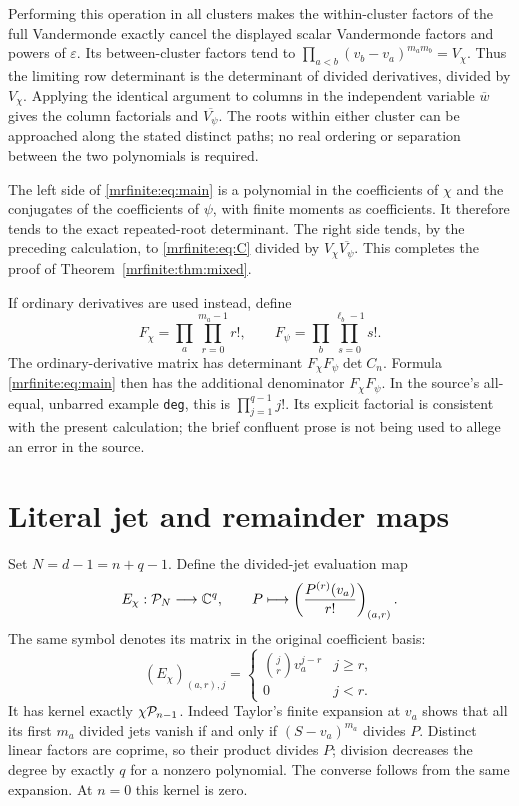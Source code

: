 Performing this operation in all clusters makes the within-cluster
factors of the full Vandermonde exactly cancel the displayed scalar
Vandermonde factors and powers of \(\varepsilon\). Its between-cluster
factors tend to \(\prod_{a<b}(v_b-v_a)^{m_am_b}=V_\chi\).
Thus the limiting row determinant is the determinant of divided
derivatives, divided by \(V_\chi\). Applying the identical argument to
columns in the independent variable \(\overline w\) gives the column
factorials and \(\overline{V_\psi}\). The roots within either cluster
can be approached along the stated distinct paths; no real ordering or
separation between the two polynomials is required.

The left side of \eqref{mrfinite:eq:main} is a polynomial in the coefficients of
\(\chi\) and the conjugates of the coefficients of \(\psi\), with
finite moments as coefficients. It therefore tends to the exact
repeated-root determinant. The right side tends, by the preceding
calculation, to \eqref{mrfinite:eq:C} divided by
\(V_\chi\overline{V_\psi}\). This completes the proof of
Theorem~\ref{mrfinite:thm:mixed}.

If ordinary derivatives are used instead, define
\[
 F_\chi=\prod_a\prod_{r=0}^{m_a-1}r!,\qquad
 F_\psi=\prod_b\prod_{s=0}^{\ell_b-1}s!.
\]
The ordinary-derivative matrix has determinant
\(F_\chi F_\psi\det C_n\). Formula \eqref{mrfinite:eq:main} then has the
additional denominator \(F_\chi F_\psi\).
In the source's all-equal, unbarred example \texttt{deg}, this is
\(\prod_{j=1}^{q-1}j!\). Its explicit factorial is consistent with the
present calculation; the brief confluent prose is not being used to
allege an error in the source.

\section{Literal jet and remainder maps}\label{mrfinite:sec:maps}

Set \(N=d-1=n+q-1\). Define the divided-jet evaluation map
\begin{equation}\label{mrfinite:eq:E}
 E_\chi:\mathcal P_N\longrightarrow\mathbb C^q,
 \qquad P\longmapsto
       \left(\frac{P^{(r)}(v_a)}{r!}\right)_{(a,r)}.
\end{equation}
The same symbol denotes its matrix in the original coefficient basis:
\[
 (E_\chi)_{(a,r),j}=
 \begin{cases}\binom jr v_a^{j-r}&j\geq r,\\0&j<r.\end{cases}
\]
It has kernel exactly \(\chi\mathcal P_{n-1}\). Indeed Taylor's finite
expansion at \(v_a\) shows that all its first \(m_a\) divided jets
vanish if and only if \((S-v_a)^{m_a}\) divides \(P\). Distinct linear
factors are coprime, so their product divides \(P\); division decreases
the degree by exactly \(q\) for a nonzero polynomial. The converse
follows from the same expansion. At \(n=0\) this kernel is zero.

